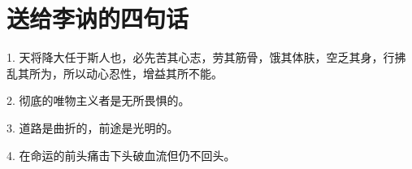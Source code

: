 \section[送给李讷的四句话（时间不详）]{送给李讷的四句话}

1. 天将降大任于斯人也，必先苦其心志，劳其筋骨，饿其体肤，空乏其身，行拂乱其所为，所以动心忍性，增益其所不能。

2. 彻底的唯物主义者是无所畏惧的。

3. 道路是曲折的，前途是光明的。

4. 在命运的前头痛击下头破血流但仍不回头。

